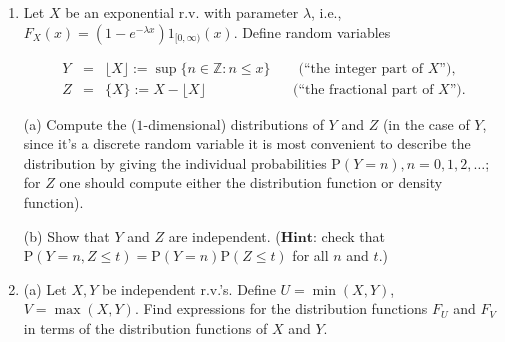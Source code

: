 \documentclass[11pt]{report}
\theoremstyle{plain}
\theoremstyle{definition}
\begin{document}
\begin{enumerate}[label=\arabic*.]
For any $n\in \mathbb{N}$ and
$a_1, a_2, \ldots, a_n \in \{0,1\}$, denote by
$B_n(a_1,\ldots,a_n)$ the set

\[
B_n(a_1,\ldots,a_n) = \{ x \in (0,1) : R_1(x)=a_1, R_2(x)=a_2, \ldots, R_n(x) = a_n \}.
\]

Find a good explicit description for this set (``the
set of all $x$'s such that ...''), and deduce from it
that

\[
\mathrm{P}(B_n(a_1,\ldots,a_n)) = \frac{1}{2^n}.
\]

(c) Define a function
$f:(0,1) \to \{0,1\}^{\mathbb{N}}$ by

\[
f(x) = (R_1(x), R_2(x), R_3(x), \ldots).
\]

Prove that $f$ is a measurable function when the
space $\{0,1\}^{\mathbb{N}}$ is equipped with the
$\sigma$-algebra generated by the sets

\[
A_n(1) = \{ (x_1,x_2,\ldots) \in \{0,1\}^{\mathbb{N}} : x_n = 1 \}.
\]

(d) Prove that the push-forward of Lebesgue measure
under $f$ is the probability measure corresponding to
the random experiment of an infinite sequence of fair
coin tosses.

\item Let $X$ be an exponential r.v. with parameter
$\lambda$, i.e.,
$F_X(x)=(1-e^{-\lambda x}) 1_{[0,\infty)}(x)$. Define
random variables

\begin{eqnarray*}
Y &=& \lfloor X \rfloor := \sup \{ n\in \mathbb{Z} : n \le x \} \qquad\textrm{(``the integer part of $X$'')}, \\
Z &=& \{ X \} := X-\lfloor X \rfloor \qquad \qquad\ \qquad\textrm{(``the fractional part of $X$'')}.
\end{eqnarray*}

(a) Compute the ($1$-dimensional) distributions of
$Y$ and $Z$ (in the case of $Y$, since it's a
discrete random variable it is most convenient to
describe the distribution by giving the individual
probabilities $\mathrm{P}(Y=n), n=0,1,2,\ldots$; for
$Z$ one should compute either the distribution
function or density function).

(b) Show that $Y$ and $Z$ are independent.
($\textbf{Hint:}$ check that
$\mathrm{P}(Y=n, Z\le
t)=\mathrm{P}(Y=n)\mathrm{P}(Z\le t)$
for all $n$ and $t$.)

\item (a) Let $X, Y$ be independent r.v.'s. Define
$U=\min(X,Y)$, $V=\max(X,Y)$. Find expressions for
the distribution functions $F_U$ and $F_V$ in terms
of the distribution functions of $X$ and $Y$.


\end{enumerate}
\end{document}
